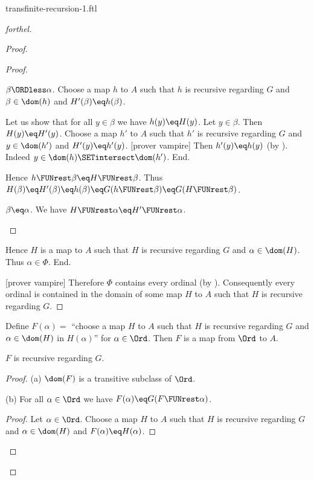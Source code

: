 \documentclass{naproche-library}
\begin{document}
\begin{smodule}[title=Transfinite Recursion I]{transfinite-recursion-1.ftl}
\begin{proof}[forthel]
\begin{proof}
\begin{proof}
        \begin{case}{$\beta \ORDless \alpha$.}
          Choose a map $h$ to $A$ such that $h$ is recursive regarding $G$ and $\beta \in \dom(h)$ and $H'(\beta) \eq h(\beta)$.

          Let us show that for all $y \in \beta$ we have $h(y) \eq H(y)$.
            Let $y \in \beta$.
            Then $H(y) \eq H'(y)$.
            Choose a map $h'$ to $A$ such that $h'$ is recursive regarding $G$ and $y \in \dom(h')$ and $H'(y) \eq h'(y)$.
            [prover vampire]
            Then $h'(y) \eq h(y)$ (by ).
            Indeed $y \in \dom(h) \SETintersect \dom(h')$.
          End.

          Hence $h \FUNrest \beta \eq H \FUNrest \beta$.
          Thus $H(\beta)
            \eq H'(\beta)
            \eq h(\beta)
            \eq G(h \FUNrest \beta)
            \eq G(H \FUNrest \beta)$.
        \end{case}

        \begin{case}{$\beta \eq \alpha$.}
          We have $H \FUNrest \alpha \eq H' \FUNrest \alpha$.
        \end{case}
      \end{proof}

      Hence $H$ is a map to $A$ such that $H$ is recursive regarding $G$ and $\alpha \in \dom(H)$.
      Thus $\alpha \in \Phi$.
    End.

    [prover vampire]
    Therefore $\Phi$ contains every ordinal (by ).
    Consequently every ordinal is contained in the domain of some map $H$ to $A$ such that $H$ is recursive regarding $G$.
  \end{proof}

  Define $F(\alpha) =$ ``choose a map $H$ to $A$ such that $H$ is recursive regarding $G$ and $\alpha \in \dom(H)$ in $H(\alpha)$'' for $\alpha \in \Ord$.
  Then $F$ is a map from $\Ord$ to $A$.

  $F$ is recursive regarding $G$.
  \begin{proof}
    (a) $\dom(F)$ is a transitive subclass of $\Ord$.

    (b) For all $\alpha \in \Ord$ we have $F(\alpha) \eq G(F \FUNrest \alpha)$.
    \begin{proof}
      Let $\alpha \in \Ord$.
      Choose a map $H$ to $A$ such that $H$ is recursive regarding $G$ and $\alpha \in \dom(H)$ and $F(\alpha) \eq H(\alpha)$.


\end{proof}
\end{proof}
\end{proof}
\end{smodule}
\end{document}
